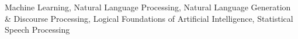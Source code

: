 Machine Learning, Natural Language Processing, Natural Language Generation \& Discourse Processing, Logical Foundations of Artificial Intelligence, Statistical Speech Processing
